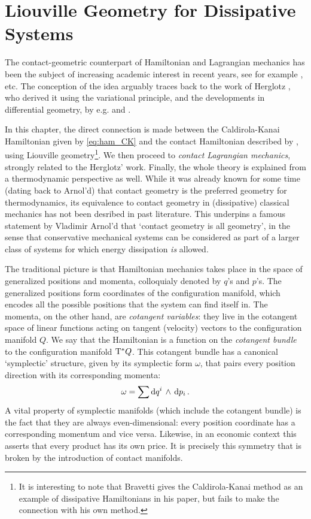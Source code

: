\chapter{Liouville Geometry for Dissipative Systems}
\label{chap:contact_mechanics}
The contact-geometric counterpart of Hamiltonian and Lagrangian mechanics has been the subject of increasing academic interest in recent years, see for example \citet{VanderSchaft2021a,VanderSchaft2018,Maschke2018,Bravetti2017,DeLeon2020}, etc. The conception of the idea arguably traces back to the work of Herglotz \cite{Guenther1996}, who derived it using the variational principle, and the developments in differential geometry, by e.g. \citet{Arnold1989,Arnold1989a,Arnold1989b,Arnold1991} and \citet{Libermann1987}.

In this chapter, the direct connection is made between the Caldirola-Kanai Hamiltonian given by \cref{eq:ham_CK} and the contact Hamiltonian described by \citet{Bravetti2017}, using Liouville geometry\footnote{It is interesting to note that Bravetti gives the Caldirola-Kanai method as an example of dissipative Hamiltonians in his paper, but fails to make the connection with his own method.}. We then proceed to \emph{contact Lagrangian mechanics}, strongly related to the Herglotz' work. Finally, the whole theory is explained from a thermodynamic perspective as well. While it was already known for some time (dating back to Arnol'd) that contact geometry is the preferred geometry for thermodynamics, its equivalence to contact geometry in (dissipative) classical mechanics has not been desribed in past literature. This underpins a famous statement by Vladimir Arnol'd that `contact geometry is all geometry', in the sense that conservative mechanical systems can be considered as part of a larger class of systems for which energy dissipation \emph{is} allowed. \cite{Geiges2008}

The traditional picture is that Hamiltonian mechanics takes place in the space of generalized positions and momenta, colloquialy denoted by $q$'s and $p$'s. The generalized positions form coordinates of the configuration manifold, which encodes all the possible positions that the system can find itself in. The momenta, on the other hand, are \emph{cotangent variables}: they live in the cotangent space of linear functions acting on tangent (velocity) vectors to the configuration manifold $Q$. We say that the Hamiltonian is a function on the \emph{cotangent bundle} to the configuration manifold $\mathrm{T}^*Q$. This cotangent bundle has a canonical `symplectic' structure, given by its symplectic form $\omega$, that pairs every position direction with its corresponding momenta:
$$ \omega = \sum  \dd{q^i}\,\wedge\,\dd{p_i} . $$
A vital property of symplectic manifolds (which include the cotangent bundle) is the fact that they are always even-dimensional: every position coordinate has a corresponding momentum and vice versa. Likewise, in an economic context this asserts that every product has its own price. It is precisely this symmetry that is broken by the introduction of contact manifolds.

